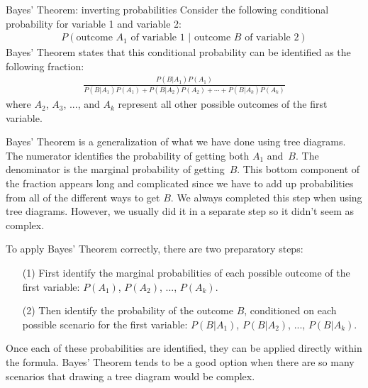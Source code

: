 \begin{onebox}{Bayes' Theorem: inverting probabilities}
Consider the following conditional probability for variable 1 and variable 2:\vspace{-1.5mm}
\begin{align*}
P(\text{outcome $A_1$ of variable 1 } | \text{ outcome $B$ of variable 2})
\end{align*}
Bayes' Theorem states that this conditional probability can be identified as the following fraction:\vspace{-1.5mm}
\begin{align*}
\frac{P(B | A_1) P(A_1)}
	{P(B | A_1) P(A_1) + P(B | A_2) P(A_2) + \cdots + P(B | A_k) P(A_k)}
\end{align*}
where $A_2$, $A_3$, ..., and $A_k$ represent all other possible outcomes of the first variable.
\end{onebox}

Bayes' Theorem is a generalization of what we have done
using tree diagrams.
The numerator identifies the probability of getting both
$A_1$ and~$B$.
The denominator is the marginal probability of getting~$B$.
This bottom component of the fraction appears long and
complicated since we have to add up probabilities from all of the different ways to get $B$. We always completed this step when using tree diagrams. However, we usually did it in a separate step so it didn't seem as complex.

\noindent%
To apply Bayes' Theorem correctly, there are two preparatory steps:
\begin{enumerate}
\setlength{\itemsep}{0mm}
\item[(1)] First identify the marginal probabilities of each possible outcome of the first variable: $P(A_1)$, $P(A_2)$, ..., $P(A_k)$.
\item[(2)] Then identify the probability of the outcome $B$, conditioned on each possible scenario for the first variable: $P(B | A_1)$, $P(B | A_2)$, ..., $P(B | A_k)$.
\end{enumerate}
Once each of these probabilities are identified, they can be applied directly within the formula.
Bayes' Theorem tends to be a good option when there are so many scenarios that drawing a tree diagram would be complex.

